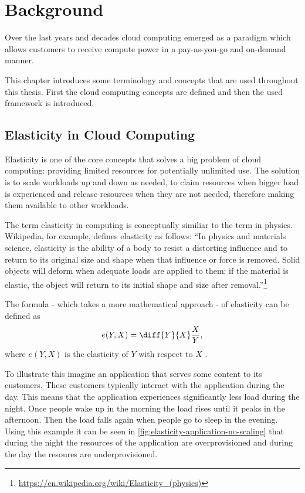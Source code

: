 \chapter{Background}
\label{ch:background}

Over the last years and decades cloud computing emerged as a paradigm which allows customers to receive compute power in a pay-as-you-go and on-demand manner.

This chapter introduces some terminology and concepts that are used throughout this thesis. First the cloud computing concepts are defined and then the used framework is introduced.

\section{Elasticity in Cloud Computing}

Elasticity is one of the core concepts that solves a big problem of cloud computing: providing limited resources for potentially unlimited use. The solution is to scale workloads up and down as needed, to claim resources when bigger load is experienced and release resources when they are not needed, therefore making them available to other workloads.

The term elasticity in computing is conceptually similiar to the term in physics. Wikipedia, for example, defines elasticity as follows: ``In physics and materials science, elasticity is the ability of a body to resist a distorting influence and to return to its original size and shape when that influence or force is removed. Solid objects will deform when adequate loads are applied to them; if the material is elastic, the object will return to its initial shape and size after removal.''\footnote{\url{https://en.wikipedia.org/wiki/Elasticity_(physics)}}


The formula - which takes a more mathematical approach - of elasticity can be defined as \[ e(Y, X) = \diff{Y}{X} \frac{X}{Y}, \] where \(e(Y, X)\) is the elasticity of \(Y\) with respect to \(X\) \cite{dustdarPrinciplesElasticProcesses2011}.

To illustrate this imagine an application that serves some content to its customers. These customers typically interact with the application during the day. This means that the application experiences significantly less load during the night. Once people wake up in the morning the load rises until it peaks in the afternoon. Then the load falls again when people go to sleep in the evening. Using this example it can be seen in \cref{fig:elasticity-application-no-scaling} that during the night the resources of the application are overprovisioned and during the day the resoures are underprovisioned.

